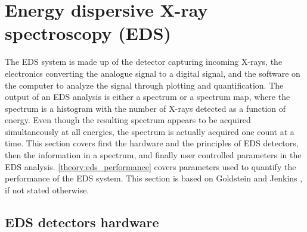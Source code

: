 \clearpage


\section{Energy dispersive X-ray spectroscopy (EDS)}
\label{theory:eds}



The EDS system is made up of the detector capturing incoming X-rays, the electronics converting the analogue signal to a digital signal, and the software on the computer to analyze the signal through plotting and quantification.
The output of an EDS analysis is either a spectrum or a spectrum map, where the spectrum is a histogram with the number of X-rays detected as a function of energy.
Even though the resulting spectrum appears to be acquired simultaneously at all energies, the spectrum is actually acquired one count at a time.
This section covers first the hardware and the principles of EDS detectors, then the information in a spectrum, and finally user controlled parameters in the EDS analysis.
\cref{theory:eds_performance} covers parameters used to quantify the performance of the EDS system. 
This section is based on Goldstein \cite{goldstein_scanning_2018} and Jenkins \cite{jenkins_xrayspectroscopy}, if not stated otherwise.




\subsection{EDS detectors hardware}
\label{theory:eds:hardware}


